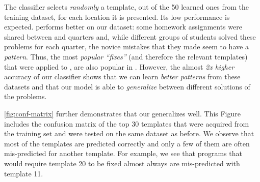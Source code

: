 The \random classifier selects \emph{randomly} a template, out of the 50 learned
ones from the \SPRING training dataset, for each location it is presented. Its
low performance is expected. \popular performs better on our dataset: some
homework assignments were shared between \SPRING and \FALL quarters and, while
different groups of students solved these problems for each quarter, the novice
mistakes that they made seem to have a \emph{pattern}. Thus, the most
\emph{popular ``fixes''} (and therefore the relevant templates) that were
applied to \SPRING, are also popular in \FALL. However, the almost \emph{2x
higher} accuracy of our \dnn classifier shows that we can learn \emph{better
patterns} from these datasets and that our \dnn model is able to
\emph{generalize} between different solutions of the problems.

\autoref{fig:conf-matrix} further demonstrates that our \dnn generalizes well.
This Figure includes the confusion matrix of the top 30 templates that were
acquired from the training set and were tested on the same \FALL dataset as
before. We observe that most of the templates are predicted correctly and only a
few of them are often mis-predicted for another template. For example, we see
that programs that would require template 20 to be fixed almost always are
mis-predicted with template 11.






